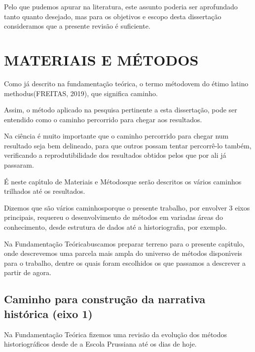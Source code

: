 \documentclass[
12pt,		%
openright,	%
twoside,  %
a4paper,			%
chapter=TITLE,		%
english,			%
french,				%
spanish,			%
brazil				%
]{USPSC-classe/USPSC}
\begin{document}
Pelo que pudemos apurar na literatura, este assunto poderia ser aprofundado tanto quanto desejado, mas para os objetivos e escopo desta disserta\c{c}\~ao consideramos que a presente revis\~ao \'e suficiente.


\chapter[MATERIAIS E M\'ETODOS]{MATERIAIS E M\'ETODOS}\label{MATERIAIS E M\'ETODOS}
Como j\'a descrito na fundamenta\c{c}\~ao te\'orica, o termo \textquotedbl m\'etodo\textquotedbl  vem do \'etimo latino \textquotedbl methodus\textquotedbl   (FREITAS, 2019), que significa \textquotedbl caminho\textquotedbl .


Assim, o m\'etodo aplicado na pesquisa pertinente a esta disserta\c{c}\~ao, pode ser entendido como o caminho percorrido para chegar aos resultados.


Na ci\^encia \'e muito importante que o caminho percorrido para chegar num resultado seja bem delineado, para que outros possam tentar percorr\^e-lo tamb\'em, verificando a reprodutibilidade dos resultados obtidos pelos que por ali j\'a passaram.


\'E neste cap\'{\i}tulo de \textquotedbl Materiais e M\'etodos\textquotedbl  que ser\~ao descritos os v\'arios caminhos trilhados at\'e os resultados.


Dizemos que s\~ao \textquotedbl v\'arios caminhos\textquotedbl  porque o presente trabalho, por envolver 3 eixos principais, requereu o desenvolvimento de m\'etodos em variadas \'areas do conhecimento, desde estrutura de dados at\'e a historiografia, por exemplo.


Na \textquotedbl Fundamenta\c{c}\~ao Te\'orica\textquotedbl  buscamos preparar terreno para o presente cap\'{\i}tulo, onde descrevemos uma parcela mais ampla do universo de m\'etodos dispon\'{\i}veis para o trabalho, dentre os quais foram escolhidos os que passamos a descrever a partir de agora.


\section[Caminho para constru\c{c}\~ao da narrativa hist\'orica (eixo 1)]{Caminho para constru\c{c}\~ao da narrativa hist\'orica (eixo 1)}\label{Caminho para constru\c{c}\~ao da narrativa hist\'orica (eixo 1)}
Na Fundamenta\c{c}\~ao Te\'orica fizemos uma revis\~ao da evolu\c{c}\~ao dos m\'etodos historiogr\'aficos desde de a Escola Prussiana at\'e os dias de hoje.
\end{document}
